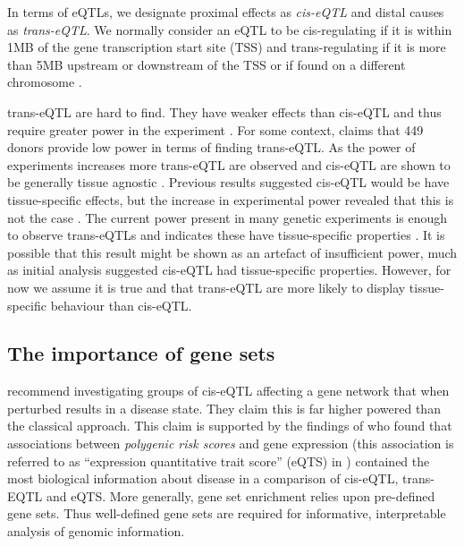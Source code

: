 \documentclass[11pt]{article} %
\begin{document}
	In terms of eQTLs, we designate proximal effects as \emph{cis-eQTL} and distal causes as 
	\emph{trans-eQTL}. We normally consider an eQTL to be cis-regulating if it is within 1MB of the 
	gene transcription start site (TSS) and trans-regulating if it is more than 5MB upstream or 
	downstream of the TSS or if found on a different chromosome \cite{nica_expression_2013}.
	
	trans-eQTL are hard to find. They have weaker effects than cis-eQTL and thus require greater power 
	in the experiment \cite{dixon_genome-wide_2007}. For some context, \citet{burgess_gene_2017} claims 
	that 449 donors provide low power in terms of finding trans-eQTL. As the power of experiments increases 
	more trans-eQTL are observed and cis-eQTL are shown to be generally tissue agnostic 
	\cite{gtex_consortium_genetic_2017}. Previous results suggested cis-eQTL would be have tissue-specific effects, 
	but the increase in experimental power revealed that this is not the case \cite{grundberg_mapping_2012}. 
	The current power present in many genetic experiments is enough to observe trans-eQTLs and indicates 
	these have tissue-specific properties \cite{grundberg_mapping_2012}\cite{gtex_consortium_genetic_2017}. It is possible that this result might be shown as an artefact of insufficient power, much as initial analysis suggested cis-eQTL had tissue-specific properties. However, for now we assume it is true and that trans-eQTL are more likely to display tissue-specific behaviour 
	than cis-eQTL.
	
	\subsection{The importance of gene sets}
	\citet{nica_expression_2013} recommend investigating groups of cis-eQTL affecting a gene network that 
	when perturbed results in a disease state. They claim this is far higher powered than the classical 
	approach. This claim is supported by the findings of \citet{vosa_unraveling_2018} who found that 
	associations between \emph{polygenic risk scores} and gene expression (this association is referred 
	to as ``expression quantitative trait score'' (eQTS) in \cite{vosa_unraveling_2018}) contained the 
	most biological information about disease in a comparison of cis-eQTL, trans-EQTL and eQTS. More generally, gene set enrichment \cite{subramanian_gene_2005} relies upon pre-defined gene sets. Thus well-defined gene sets are required for informative, interpretable analysis of genomic information.
	
\end{document}
